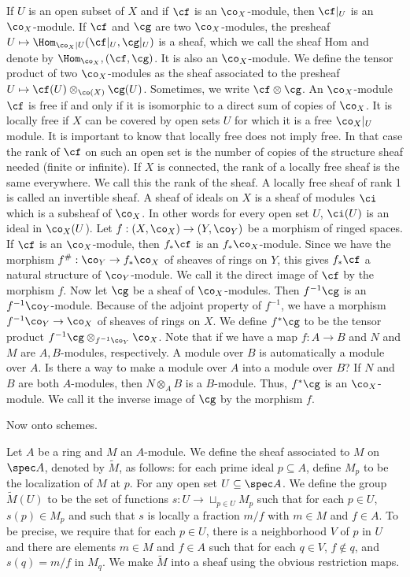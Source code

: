 If $U$ is an open subset of $X$ and if $\cf$ is an $\co_X$-module, then $\cf|_U$ is an $\co_X$-module. If $\cf$ and $\cg$ are two $\co_X$-modules, the presheaf $U \mapsto \Hom_{\co_X|U}(\cf|_U,\cg|_U)$ is a sheaf, which we call the sheaf Hom and denote by $\Hom_{\co_X},(\cf,\cg)$. It is also an $\co_X$-module. We define the tensor product of two $\co_X$-modules as the sheaf associated to the presheaf $U \mapsto \cf(U) \otimes_{\co(X)} \cg(U)$. Sometimes, we write $\cf \otimes \cg$. An $\co_X$-module $\cf$ is free if and only if it is isomorphic to a direct sum of copies of $\co_X$. It is locally free if $X$ can be covered by open sets $U$ for which it is a free $\co_X|_U$ module. It is important to know that locally free does not imply free. In that case the rank of $\cf$ on such an open set is the number of copies of the structure sheaf needed (finite or infinite). If $X$ is connected, the rank of a locally free sheaf is the same everywhere. We call this the rank of the sheaf. A locally free sheaf of rank 1 is called an invertible sheaf. A sheaf of ideals on $X$ is a sheaf of modules $\ci$ which is a subsheaf of $\co_X$. In other words for every open set $U$, $\ci(U)$ is an ideal in $\co_X(U$). Let $f: (X,\co_X) \to (Y,\co_Y)$ be a morphism of ringed spaces. If $\cf$ is an $\co_X$-module, then $f_*\cf$ is an $f_*\co_X$-module. Since we have the morphism $f^\#: \co_Y \to f_*\co_X$ of sheaves of rings on $Y$, this gives $f_*\cf$ a natural structure of $\co_Y$-module. We call it the direct image of $\cf$ by the morphism $f$. Now let $\cg$ be a sheaf of $\co_X$-modules. Then $f^{-1}\cg$ is an $f^{-1} \co_Y$-module. Because of the adjoint property of $f^{-1}$, we have a morphism $f^{-1} \co_Y \to \co_X$ of sheaves of rings on $X$. We define $f^*\cg$ to be the tensor product $f^{-1}\cg \otimes_{f^{-1}\co_Y} \co_X$. Note that if we have a map $f: A \to B$ and $N$ and $M$ are $A,B$-modules, respectively. A module over $B$ is automatically a module over $A$. Is there a way to make a module over $A$ into a module over $B$? If $N$ and $B$ are both $A$-modules, then $N \otimes_A B$ is a $B$-module. Thus, $f^*\cg$ is an $\co_X$-module. We call it the inverse image of $\cg$ by the morphism $f$. 


Now onto schemes. 


\begin{dfn}
Let $A$ be a ring and $M$ an $A$-module. We define the sheaf associated to $M$ on $\spec A$, denoted by $\tilde{M}$, as follows: for each prime ideal $p \subseteq A$, define $M_p$ to be the localization of $M$ at $p$. For any open set $U \subseteq \spec A$. We define the group $\tilde{M}(U)$ to be the set of functions $s: U \to \sqcup_{p \in U} M_p$ such that for each $p \in U$, $s(p) \in M_p$ and such that $s$ is locally a fraction $m/f$ with $m \in M$ and $f \in A$. To be precise, we require that for each $p \in U$, there is a neighborhood $V$ of $p$ in $U$ and there are elements $m \in M$ and $f \in A$ such that for each $q \in V$, $f \notin q$, and $s(q)=m/f$ in $M_q$. We make $\tilde{M}$ into a sheaf using the obvious restriction maps. 
\end{dfn}


